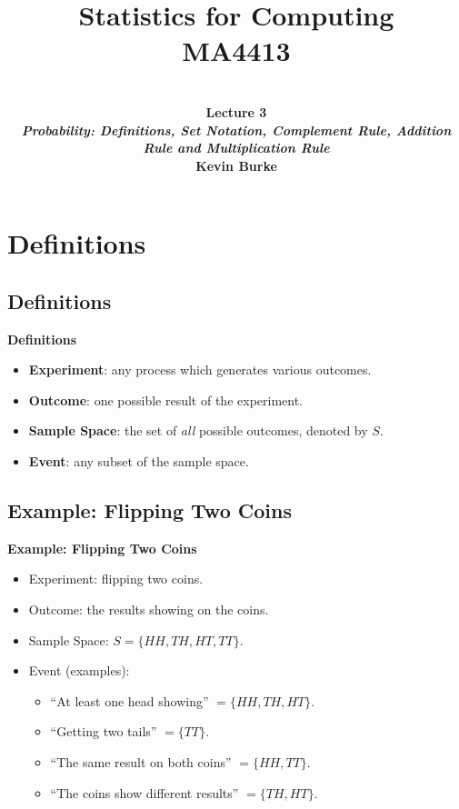 \documentclass[compress]{beamer}        %
\title{{\huge Statistics for Computing\\[0.1cm]MA4413}}
\author[Kevin Burke]{{\bf\\[0.5cm]{\huge Lecture 3}\\[0.2cm]\emph{Probability: Definitions, Set Notation, Complement Rule, Addition Rule and Multiplication Rule}\\[1.4cm]Kevin Burke}\\[0.3cm]\tcb{kevin.burke@ul.ie}}
\institute[University of Limerick, Maths \& Stats Dept]{}
\date{}
\makeatletter
\newcommand{\tcb}{\textcolor{beamer@blendedblue}}
\makeatother
\begin{document}
\begin{frame}[t]
\titlepage
\end{frame}


\section{Definitions}
\subsection{Definitions}
\begin{frame}{\bf \tcb{Definitions}}
\begin{itemize}\itemsep1cm
\item {\bf Experiment}: any process which generates various outcomes.
\item {\bf Outcome}: one possible result of the experiment.
\item {\bf Sample Space}: the set of \emph{all} possible outcomes, denoted by $S$.
\item {\bf Event}: any subset of the sample space.
\end{itemize}

\end{frame}

\subsection{Example: Flipping Two Coins}
\begin{frame}{\bf \tcb{Example: Flipping Two Coins}}
\begin{itemize}\itemsep0.6cm
\item Experiment: flipping two coins.
\item Outcome: the results showing on the coins.
\item Sample Space: $S = \{HH, TH, HT, TT\}$.
\item Event (examples):
\begin{itemize}\itemsep0.1cm
\item ``At least one head showing'' $= \{HH, TH, HT\}$.
\item ``Getting two tails'' $= \{TT\}$.
\item ``The same result on both coins'' $= \{HH, TT\}$.
\item ``The coins show different results'' $= \{TH, HT\}$.
\end{itemize}
\end{itemize}
\end{frame}
\end{document}
